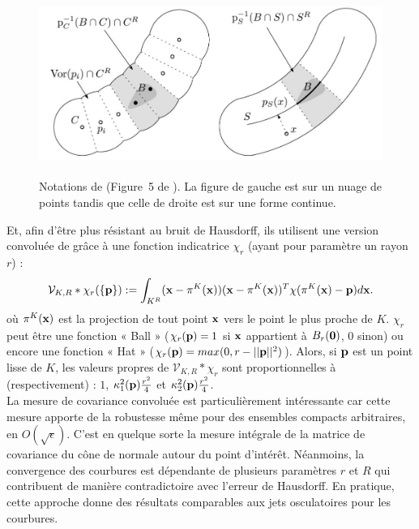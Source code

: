 \begin{figure}[ht]{
    \begin{center}
    \includegraphics[height=6cm]{images/Feature/VCM_notations}
    \end{center}}
    \caption[Notations de \VCM.]{Notations de \VCM (Figure~5 de \cite{Merigot2011}). La figure de gauche est sur un nuage de points tandis que celle de droite est sur une forme continue. \label{fig:mellado-multiscale}}
\end{figure}
%
Et, afin d'être plus résistant au bruit de Hausdorff, ils utilisent une
version convoluée de \VCM grâce à une fonction indicatrice $\chi_r$
(ayant pour paramètre un rayon $r$) :
%
\begin{equation}
  \mathcal{V}_{K,R} \ast \chi_r(\{\mathbf{p}\}) := \int_{K^R} (\mathbf{x} - \pi^K(\mathbf{x}))(\mathbf{x} - \pi^K(\mathbf{x}))^T \chi(\pi^K(\mathbf{x}) - \mathbf{p}) d\mathbf{x} .
\end{equation}
%
où $\pi^K(\mathbf{x})$ est la projection de tout point $\mathbf{x}$ vers le point le plus
proche de $K$. $\chi_r$ peut être une fonction « Ball » ($\chi_r(\mathbf{p}) = 1$ si
$\mathbf{x}$ appartient à $B_{r}(\mathbf{0})$, $0$ sinon) ou encore une fonction «
Hat » ($\chi_r(\mathbf{p}) = max(0, r - ||\mathbf{p}||^2)$).
%
Alors, si $\mathbf{p}$ est un point lisse de $K$, les valeurs propres de
$\mathcal{V}_{K,R} \ast \chi_r$ sont proportionnelles à (respectivement) : $1$,
$\kappa_{1}^2(\mathbf{p})\frac{r^2}{4}$ et $\kappa_{2}^2(\mathbf{p})\frac{r^2}{4}$.
%
\\
%
La mesure de covariance convoluée est particulièrement intéressante car cette
mesure apporte de la robustesse même pour des ensembles compacts arbitraires, en
$O(\sqrt{\epsilon})$. C'est en quelque sorte la mesure intégrale de la matrice
de covariance du cône de normale autour du point d'intérêt. Néanmoins, la
convergence des courbures est dépendante de plusieurs paramètres $r$ et $R$ qui
contribuent de manière contradictoire avec l'erreur de Hausdorff. En pratique,
cette approche donne des résultats comparables aux jets osculatoires pour les
courbures.
%
